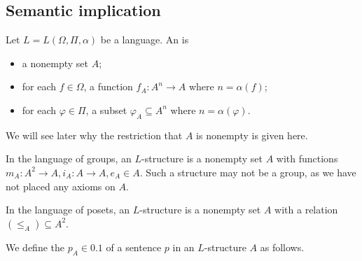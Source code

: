 \subsection{Semantic implication}
\begin{definition}
    Let $L = L(\Omega, \Pi, \alpha)$ be a language.
    An  is
    \begin{itemize}
        \item a nonempty set $A$;
        \item for each $f \in \Omega$, a function $f_A \colon A^n \to A$ where $n = \alpha(f)$;
        \item for each $\varphi \in \Pi$, a subset $\varphi_A \subseteq A^n$ where $n = \alpha(\varphi)$.
    \end{itemize}
\end{definition}
\begin{remark}
    We will see later why the restriction that $A$ is nonempty is given here.
\end{remark}
\begin{example}
    In the language of groups, an $L$-structure is a nonempty set $A$ with functions $m_A \colon A^2 \to A, i_A \colon A \to A, e_A \in A$.
    Such a structure may not be a group, as we have not placed any axioms on $A$.
\end{example}
\begin{example}
    In the language of posets, an $L$-structure is a nonempty set $A$ with a relation $(\leq_A) \subseteq A^2$.
\end{example}
We define the  $p_A \in \qty{0,1}$ of a sentence $p$ in an $L$-structure $A$ as follows.
